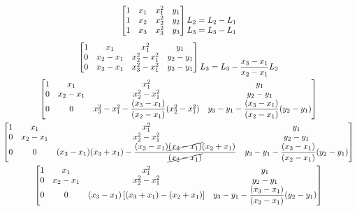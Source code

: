 \documentclass{article}
\begin{document}
\begin{gather*}
\begin{bmatrix}
    1 & x_1 & x_1^2 & y_1 \\
    1 & x_2 & x_2^2 & y_2 \\
    1 & x_3 & x_3^2 & y_3 \\
\end{bmatrix}
\begin{matrix}
    \\
    L_2 = L_2 - L_1 \\
    L_3 = L_3 - L_1
\end{matrix} \\
\begin{bmatrix}
    1 & x_1       & x_1^2         & y_1 \\
    0 & x_2 - x_1 & x_2^2 - x_1^2 & y_2 - y_1\\
    0 & x_3 - x_1 & x_3^2 - x_1^2 & y_3 - y_1\\
\end{bmatrix}
\begin{matrix}
    \\
    \\
    L_3 = L_3 - \dfrac{x_3 - x_1}{x_2 - x_1}L_2
\end{matrix} \\
\begin{bmatrix}
    1 & x_1       & x_1^2         & y_1 \\
    0 & x_2 - x_1 & x_2^2 - x_1^2 & y_2 - y_1\\
    0 & 0         & x_3^2 - x_1^2 - \dfrac{(x_3 - x_1)}{(x_2 - x_1)}(x_2^2 - x_1^2) & y_3 - y_1 - \dfrac{(x_3 - x_1)}{(x_2 - x_1)}(y_2 - y_1)\\
\end{bmatrix} \\
\begin{bmatrix}
    1 & x_1       & x_1^2         & y_1 \\
    0 & x_2 - x_1 & x_2^2 - x_1^2 & y_2 - y_1\\
    0 & 0         & (x_3 - x_1)(x_3 + x_1) - \dfrac{(x_3 - x_1)\cancel{(x_2 - x_1)}(x_2 + x_1)}{\cancel{(x_2 - x_1)}} & y_3 - y_1 - \dfrac{(x_3 - x_1)}{(x_2 - x_1)}(y_2 - y_1)\\
\end{bmatrix} \\
\begin{bmatrix}
    1 & x_1       & x_1^2         & y_1 \\
    0 & x_2 - x_1 & x_2^2 - x_1^2 & y_2 - y_1\\
    0 & 0         & (x_3 - x_1) \left[\left(x_3 + x_1\right) - \left(x_2 + x_1\right)\right] & y_3 - y_1 - \dfrac{(x_3 - x_1)}{(x_2 - x_1)}(y_2 - y_1)\\

\end{bmatrix}
\end{gather*}
\end{document}
